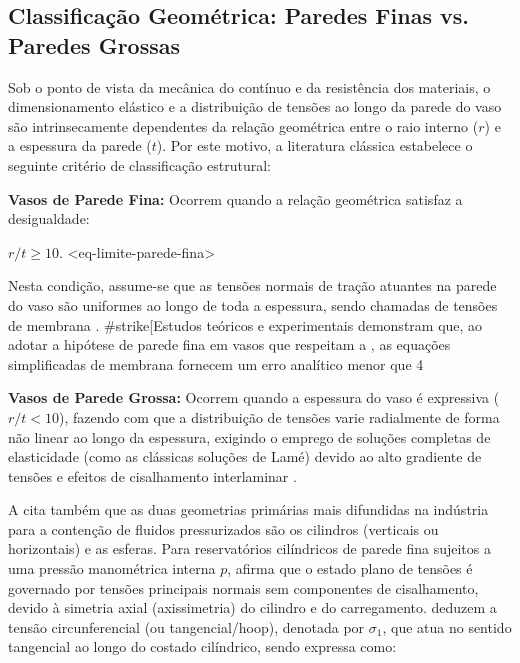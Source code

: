 \subsection{Classificação Geométrica: Paredes Finas vs. Paredes Grossas}


Sob o ponto de vista da mecânica do contínuo e da resistência dos materiais, o dimensionamento elástico e a distribuição de tensões ao longo da parede do vaso são intrinsecamente dependentes da relação geométrica entre o raio interno ($r$) e a espessura da parede ($t$). Por este motivo, a literatura clássica estabelece o seguinte critério de classificação estrutural:

\textbf{Vasos de Parede Fina:} Ocorrem quando a relação geométrica satisfaz a desigualdade:

$ r/t \ge  10. $ <eq-limite-parede-fina>

Nesta condição, assume-se que as tensões normais de tração atuantes na parede do vaso são uniformes ao longo de toda a espessura, sendo chamadas de tensões de membrana \cite[p.~415]{asme_sec8_div1_2019}. \#strike[Estudos teóricos e experimentais demonstram que, ao adotar a hipótese de parede fina em vasos que respeitam a \cite{eq-limite-parede-fina}, as equações simplificadas de membrana fornecem um erro analítico menor que 4%

\textbf{Vasos de Parede Grossa:} Ocorrem quando a espessura do vaso é expressiva ($r/t < 10$), fazendo com que a distribuição de tensões varie radialmente de forma não linear ao longo da espessura, exigindo o emprego de soluções completas de elasticidade (como as clássicas soluções de Lamé) devido ao alto gradiente de tensões e efeitos de cisalhamento interlaminar \cite[p.~591]{Sadd2009}.

A \cite[p.~19]{asme_sec8_div1_2019} cita também que as duas geometrias primárias mais difundidas na indústria para a contenção de fluidos pressurizados são os cilindros (verticais ou horizontais) e as esferas. Para reservatórios cilíndricos de parede fina sujeitos a uma pressão manométrica interna $p$, \cite[p.~159]{Sadd2009} afirma que o estado plano de tensões é governado por tensões principais normais sem componentes de cisalhamento, devido à simetria axial (axissimetria) do cilindro e do carregamento. \cite[p.~652]{beer1989resistencia} deduzem a tensão circunferencial (ou tangencial/hoop), denotada por $\sigma_1$, que atua no sentido tangencial ao longo do costado cilíndrico, sendo expressa como:

